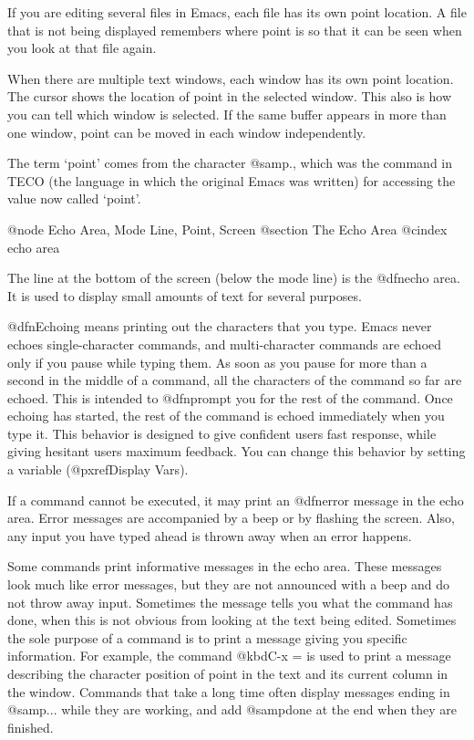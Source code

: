   If you are editing several files in Emacs, each file has its own point
location.  A file that is not being displayed remembers where point is so
that it can be seen when you look at that file again.

  When there are multiple text windows, each window has its own point
location.  The cursor shows the location of point in the selected window.
This also is how you can tell which window is selected.  If the same buffer
appears in more than one window, point can be moved in each window
independently.

  The term `point' comes from the character @samp{.}, which was the
command in TECO (the language in which the original Emacs was written)
for accessing the value now called `point'.

@node Echo Area, Mode Line, Point, Screen
@section The Echo Area
@cindex echo area

  The line at the bottom of the screen (below the mode line) is the
@dfn{echo area}.  It is used to display small amounts of text for several
purposes.

  @dfn{Echoing} means printing out the characters that you type.  Emacs
never echoes single-character commands, and multi-character commands are
echoed only if you pause while typing them.  As soon as you pause for more
than a second in the middle of a command, all the characters of the command
so far are echoed.  This is intended to @dfn{prompt} you for the rest of
the command.  Once echoing has started, the rest of the command is echoed
immediately when you type it.  This behavior is designed to give confident
users fast response, while giving hesitant users maximum feedback.  You
can change this behavior by setting a variable (@pxref{Display Vars}).

  If a command cannot be executed, it may print an @dfn{error message} in
the echo area.  Error messages are accompanied by a beep or by flashing the
screen.  Also, any input you have typed ahead is thrown away when an error
happens.

  Some commands print informative messages in the echo area.  These
messages look much like error messages, but they are not announced with a
beep and do not throw away input.  Sometimes the message tells you what the
command has done, when this is not obvious from looking at the text being
edited.  Sometimes the sole purpose of a command is to print a message
giving you specific information.  For example, the command @kbd{C-x =} is
used to print a message describing the character position of point in the
text and its current column in the window.  Commands that take a long time
often display messages ending in @samp{...} while they are working, and
add @samp{done} at the end when they are finished.


